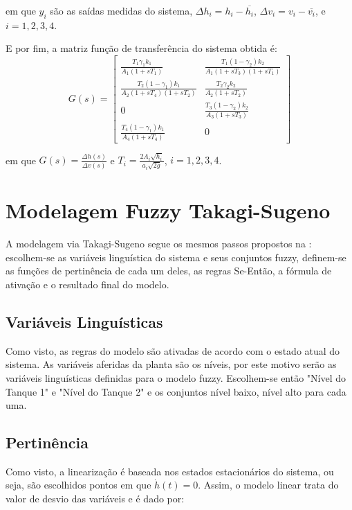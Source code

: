 em que $y_{i}$ são as saídas medidas do sistema, $\Delta h_{i}=h_{i} - \overline{h_{i}}$, $\Delta v_{i}=v_{i} - \overline{v_{i}}$, e $i=1,2,3,4$.

E por fim, a matriz função de transferência do sistema obtida é:
\begin{equation}
		G(s) = 
	\begin{bmatrix}
		\frac{T_{1}\gamma_{1}k_{1}}{A_{1}(1+sT_{1})} &  \frac{T_{1}(1-\gamma_{2})k_{2}}{A_{1}(1+sT_{3})(1+sT_{1})} \\
		\frac{T_{2}(1-\gamma_{1})k_{1}}{A_{2}(1+sT_{4})(1+sT_{2})} &  \frac{T_{2}\gamma_{2}k_{2}}{A_{2}(1+sT_{2})} \\
		0 &  \frac{T_{3}(1-\gamma_{2})k_{2}}{A_{3}(1+sT_{3})} \\
		\frac{T_{4}(1-\gamma_{1})k_{1}}{A_{4}(1+sT_{4})} &  0 
	\end{bmatrix} 
	\label{eq4}
\end{equation}

em que $G(s)=\frac{\Delta h(s)}{\Delta v(s)}$ e $T_{i}=\frac{2A_{i}\sqrt{h_{i}}}{a_{i}\sqrt{2g}}$, $i=1,2,3,4$.

\section{Modelagem Fuzzy Takagi-Sugeno} \label{secModFuzzy}
A modelagem via Takagi-Sugeno segue os mesmos passos propostos na : escolhem-se as variáveis linguística do sistema e seus conjuntos fuzzy, definem-se as funções de pertinência de cada um deles, as regras Se-Então, a fórmula de ativação e o resultado final do modelo.

\subsection{Variáveis Linguísticas}
Como visto, as regras do modelo são ativadas de acordo com o estado atual do sistema. As variáveis aferidas da planta são os níveis, por este motivo serão as variáveis linguísticas definidas para o modelo fuzzy. Escolhem-se então "Nível do Tanque 1" e "Nível do Tanque 2" e os conjuntos {nível baixo, nível alto} para cada uma.

\subsection{Pertinência}
Como visto, a linearização é baseada nos estados estacionários do sistema, ou seja, são escolhidos pontos em que $\dot{h}(t) = 0$. Assim, o modelo linear trata do valor de desvio das variáveis e é dado por: 

